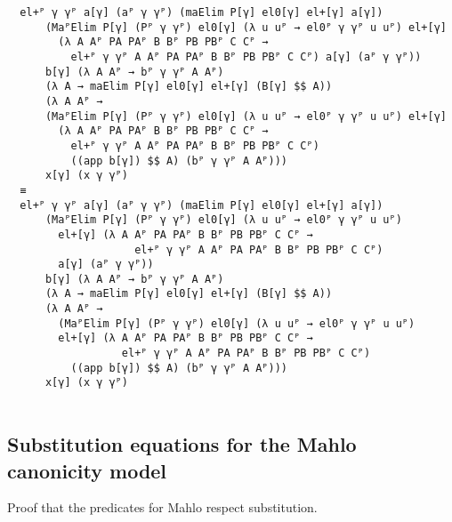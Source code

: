 \begin{verbatim}
  el+ᴾ γ γᴾ a[γ] (aᴾ γ γᴾ) (maElim P[γ] el0[γ] el+[γ] a[γ])
      (MaᴾElim P[γ] (Pᴾ γ γᴾ) el0[γ] (λ u uᴾ → el0ᴾ γ γᴾ u uᴾ) el+[γ]
        (λ A Aᴾ PA PAᴾ B Bᴾ PB PBᴾ C Cᴾ →
          el+ᴾ γ γᴾ A Aᴾ PA PAᴾ B Bᴾ PB PBᴾ C Cᴾ) a[γ] (aᴾ γ γᴾ))
      b[γ] (λ A Aᴾ → bᴾ γ γᴾ A Aᴾ)
      (λ A → maElim P[γ] el0[γ] el+[γ] (B[γ] $$ A))
      (λ A Aᴾ →
      (MaᴾElim P[γ] (Pᴾ γ γᴾ) el0[γ] (λ u uᴾ → el0ᴾ γ γᴾ u uᴾ) el+[γ]
        (λ A Aᴾ PA PAᴾ B Bᴾ PB PBᴾ C Cᴾ →
          el+ᴾ γ γᴾ A Aᴾ PA PAᴾ B Bᴾ PB PBᴾ C Cᴾ)
          ((app b[γ]) $$ A) (bᴾ γ γᴾ A Aᴾ)))
      x[γ] (x γ γᴾ)
  ≡
  el+ᴾ γ γᴾ a[γ] (aᴾ γ γᴾ) (maElim P[γ] el0[γ] el+[γ] a[γ])
      (MaᴾElim P[γ] (Pᴾ γ γᴾ) el0[γ] (λ u uᴾ → el0ᴾ γ γᴾ u uᴾ)
        el+[γ] (λ A Aᴾ PA PAᴾ B Bᴾ PB PBᴾ C Cᴾ →
                    el+ᴾ γ γᴾ A Aᴾ PA PAᴾ B Bᴾ PB PBᴾ C Cᴾ)
        a[γ] (aᴾ γ γᴾ))
      b[γ] (λ A Aᴾ → bᴾ γ γᴾ A Aᴾ)
      (λ A → maElim P[γ] el0[γ] el+[γ] (B[γ] $$ A))
      (λ A Aᴾ →
        (MaᴾElim P[γ] (Pᴾ γ γᴾ) el0[γ] (λ u uᴾ → el0ᴾ γ γᴾ u uᴾ)
        el+[γ] (λ A Aᴾ PA PAᴾ B Bᴾ PB PBᴾ C Cᴾ →
                  el+ᴾ γ γᴾ A Aᴾ PA PAᴾ B Bᴾ PB PBᴾ C Cᴾ)
          ((app b[γ]) $$ A) (bᴾ γ γᴾ A Aᴾ)))
      x[γ] (x γ γᴾ)


\end{verbatim}

\subsection{Substitution equations for the Mahlo canonicity model}

Proof that the predicates for Mahlo respect substitution.

